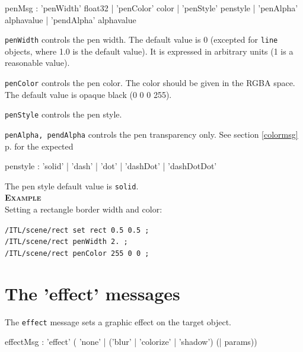 \documentclass[a4paper,twoside]{report}
\newcommand{\sublevel}[1]	{\section{#1}}
\newcommand{\fullref}[1]	{\ref{#1} p.\pageref{#1}}
\newcommand{\OSC}[1]		{\texttt{#1}}
\newcommand{\example}		{\textbf{\hspace{-1.5cm}\textbf{\textsc{Example }}}}
\let\olditemize\itemize
\let\oldenditemize\enditemize
\renewenvironment{itemize} 	{\olditemize \setlength{\itemsep}{1mm}}{\oldenditemize}
\newcommand{\sample}	[1]			{\vspace{-2mm}\begin{center}\colorbox{mygrey}{
								\begin{minipage}[t]{0.9\columnwidth} 
								{\small \texttt{#1}}
								\end{minipage}}\end{center}}
\begin{document}
\begin{rail}
penMsg : 	  'penWidth' float32
			| 'penColor' color 
			| 'penStyle' penstyle
			| 'penAlpha' alphavalue
			| 'pendAlpha' alphavalue
\end{rail}

\begin{itemize}
\item \OSC{penWidth} controls the pen width. The default value is 0 (excepted for \OSC{line} objects, where 1.0 is the default value). It is expressed in arbitrary units (1 is a reasonable value).
\item \OSC{penColor} controls the pen color. The color should be given in the RGBA space. The default value is opaque black (0 0 0 255).
\item \OSC{penStyle} controls the pen style.
\item \OSC{penAlpha, pendAlpha} controls the pen transparency only. See section \fullref{colormsg} for the expected 
 \end{itemize}


\begin{rail}
penstyle : 'solid' | 'dash' | 'dot' | 'dashDot' | 'dashDotDot'
\end{rail}

The pen style default value is \OSC{solid}.\\

\example \\
Setting a rectangle border width and color:
\sample{/ITL/scene/rect set rect 0.5 0.5 ;\\
/ITL/scene/rect penWidth 2. ;\\
/ITL/scene/rect penColor 255 0 0 ;  
}

\sublevel{The 'effect' messages}
\label{effectmsg}

The \OSC{effect} message sets a graphic effect on the target object.

\begin{rail}
effectMsg : 'effect' ( 'none'
		| ('blur'
		| 'colorize'
		| 'shadow') (| params)) 		
\end{rail}
\end{document}
